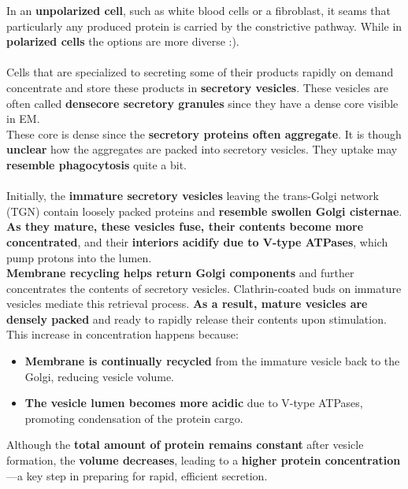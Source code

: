 \documentclass[../main.tex]{subfiles}
\begin{document}
\indent In an \textbf{unpolarized cell}, such as white blood cells or a fibroblast, it seams that particularly any produced protein is carried by the constrictive pathway. While in \textbf{polarized cells} the options are more diverse :). \\
\\
Cells that are specialized to secreting some of their products rapidly on demand concentrate and store these products in \textbf{secretory vesicles}. These vesicles are often called \textbf{densecore secretory granules} since they have a dense core visible in EM. \\
\indent These core is dense since the \textbf{secretory proteins often aggregate}. It is though \textbf{unclear} how the aggregates are packed into secretory vesicles. They uptake may \textbf{resemble phagocytosis} quite a bit. \\
\\
Initially, the \textbf{immature secretory vesicles} leaving the trans-Golgi network (TGN) contain loosely packed proteins and \textbf{resemble swollen Golgi cisternae}. \textbf{As they mature, these vesicles fuse, their contents become more concentrated}, and their \textbf{interiors acidify due to V-type ATPases}, which pump protons into the lumen.
\\
\indent\textbf{Membrane recycling helps return Golgi components} and further concentrates the contents of secretory vesicles. Clathrin-coated buds on immature vesicles mediate this retrieval process. \textbf{As a result, mature vesicles are densely packed} and ready to rapidly release their contents upon stimulation.\\
\indent This increase in concentration happens because:
\begin{itemize}
	\item \textbf{Membrane is continually recycled} from the immature vesicle back to the Golgi, reducing vesicle volume.
	\item \textbf{The vesicle lumen becomes more acidic} due to V-type ATPases, promoting condensation of the protein cargo.
\end{itemize}
Although the \textbf{total amount of protein remains constant} after vesicle formation, the \textbf{volume decreases}, leading to a \textbf{higher protein concentration}—a key step in preparing for rapid, efficient secretion.
\end{document}
